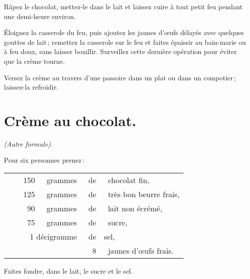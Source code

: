 Râpez le chocolat, mettez-le dans le lait et laissez cuire à tout petit feu pendant
une demi-heure environ.

Éloignez la casserole du feu, puis ajoutez les jaunes d'œufs délayés avec
quelques gouttes de lait ; remettez la casserole sur le feu et faites épaissir
au bain-marie ou à feu doux, sans laisser bouillir. Surveillez cette dernière
opération pour éviter que la crème tourne.

Versez la crème au travers d'une passoire dans un plat ou dans un compotier ;
laissez-la refroidir.

\section*{\centering Crème au chocolat.}
{}

\begin{center}
\textit{(Autre formule).}
\end{center}

Pour six personnes prenez :

\setlength\tabcolsep{.1em}
\footnotesize
\begin{longtable}{rrrrrp{18em}}
  & \hspace{2em} & 150 & grammes & de & chocolat fin,                                                     \\
  & \hspace{2em} & 125 & grammes & de & très bon beurre frais,                                            \\
  & \hspace{2em} &  90 & grammes & de & lait non écrémé,                                                  \\
  & \hspace{2em} &  75 & grammes & de & sucre,                                                            \\
  & \multicolumn{3}{r}{1 décigramme} & de & sel,                                                          \\
  & \hspace{2em} &     &         &  8 & jaunes d'œufs frais.                                              \\
\end{longtable}
\normalsize

Faites fondre, dans le lait, le sucre et le sel.

